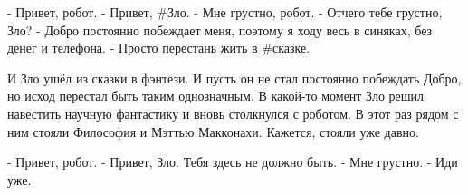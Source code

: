 - Привет, робот.
- Привет, #Зло.
- Мне грустно, робот.
- Отчего тебе грустно, Зло?
- Добро постоянно побеждает меня, поэтому я ходу весь в синяках, без денег и телефона.
- Просто перестань жить в #сказке.

И Зло ушёл из сказки в фэнтези. И пусть он не стал постоянно побеждать Добро, но исход перестал быть таким однозначным. В какой-то момент Зло решил навестить научную фантастику и вновь столкнулся с роботом. В этот раз рядом с ним стояли Философия и Мэттью Макконахи. Кажется, стояли уже давно.

- Привет, робот.
- Привет, Зло. Тебя здесь не должно быть.
- Мне грустно.
- Иди уже.